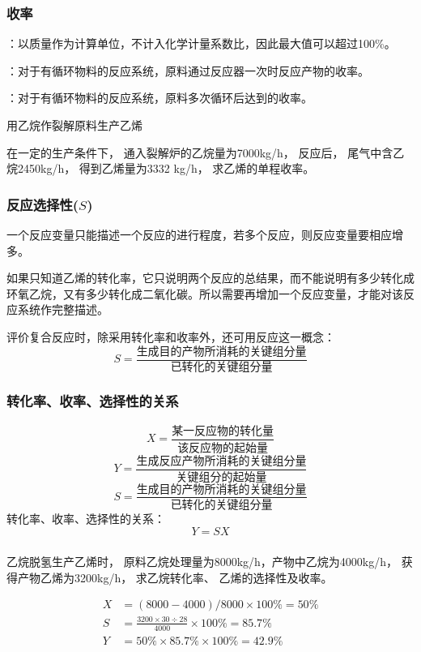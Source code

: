 \documentclass[dvipsnames, svgnames, x11names]{beamer}
\begin{document}
\begin{frame}
    \frametitle{收率}
    ：以质量作为计算单位，不计入化学计量系数比，因此最大值可以超过100\%。

    ：对于有循环物料的反应系统，原料通过反应器一次时反应产物的收率。

    ：对于有循环物料的反应系统，原料多次循环后达到的收率。
    \begin{example}
      用乙烷作裂解原料生产乙烯 
      
      在一定的生产条件下， 通入裂解炉的乙烷量为7000kg/h， 反应后， 尾气中含乙烷2450kg/h， 得到乙烯量为3332 kg/h， 求乙烯的单程收率。
    \end{example}
\end{frame}


\begin{frame}
    \frametitle{反应选择性($S$)}
    一个反应变量只能描述一个反应的进行程度，若多个反应，则反应变量要相应增多。
    \begin{center}

    \end{center}
    如果只知道乙烯的转化率，它只说明两个反应的总结果，而不能说明有多少转化成环氧乙烷，又有多少转化成二氧化碳。所以需要再增加一个反应变量，才能对该反应系统作完整描述。
    
    评价复合反应时，除采用转化率和收率外，还可用反应这一概念：
    \[
        S = \frac{\text{生成目的产物所消耗的关键组分量}}{\text{已转化的关键组分量}}
    \]
\end{frame}


\begin{frame}
    \frametitle{转化率、收率、选择性的关系}
    \[
      X = \frac{\text{某一反应物的转化量}}{\text{该反应物的起始量}}
    \]
    \[
        Y=\frac{\text{生成反应产物所消耗的关键组分量}}{\text{关键组分的起始量}}
    \]
    \[
        S = \frac{\text{生成目的产物所消耗的关键组分量}}{\text{已转化的关键组分量}}
    \]
    转化率、收率、选择性的关系：
    \[
        Y = SX
    \]
\end{frame}


\begin{frame}[t]
    \frametitle{}
    \begin{example}
      乙烷脱氢生产乙烯时， 原料乙烷处理量为8000kg/h，产物中乙烷为4000kg/h， 获得产物乙烯为3200kg/h， 求乙烷转化率、 乙烯的选择性及收率。
    \end{example}
    \pause
    \[
        \begin{aligned}
             X &= (8000-4000)/8000 \times 100\% = 50\%\\
             S &= \frac{3200\times 30 \div 28}{4000} \times 100\% = 85.7\%\\
             Y &= 50\% \times 85.7\% \times 100\% = 42.9\%
        \end{aligned}
    \]
\end{frame}
\end{document}
